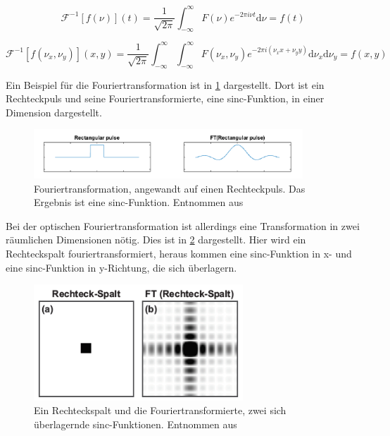 \begin{equation}
	\mathcal{F}^{-1}\left[ f\left( \nu\right) \right] \left( t\right) = \frac{1}{\sqrt{2\pi}} \int_{-\infty}^{\infty} F\left( \nu\right) e^{-2\pi i \nu t} \text{d}\nu = f\left( t\right) 
	\label{eq:trück}
\end{equation}

\begin{equation}
	\mathcal{F}^{-1}\left[ f\left( \nu_x,\nu_y\right) \right] \left( x, y\right) = \frac{1}{\sqrt{2\pi}} \int_{-\infty}^{\infty} \int_{-\infty}^{\infty} F\left( \nu_x,\nu_y\right) e^{-2\pi i (\nu_x x + \nu_y y)} \text{d}\nu_x \text{d}\nu_y = f\left( x, y\right) 
	\label{eq:xyrück}
\end{equation}

Ein Beispiel für die Fouriertransformation ist in \cref{rechteckpuls} dargestellt. Dort ist ein Rechteckpuls und seine Fouriertransformierte, eine sinc-Funktion, in einer Dimension dargestellt. 

\begin{figure}[h!]
	\centering
	\includegraphics[width=0.9\textwidth]{rechteckpuls.png}
	\caption{Fouriertransformation, angewandt auf einen Rechteckpuls. Das Ergebnis ist eine sinc-Funktion. Entnommen aus \cite[3]{anleitung-ws2014}}
	\label{rechteckpuls}
\end{figure}

Bei der optischen Fouriertransformation ist allerdings eine Transformation in zwei räumlichen Dimensionen nötig. Dies ist in \cref{rechteckspalt} dargestellt. Hier wird ein Rechteckspalt fouriertransformiert, heraus kommen eine sinc-Funktion in x- und eine sinc-Funktion in y-Richtung, die sich überlagern.

\begin{figure}[h!]
	\centering
	\includegraphics[width=0.7\textwidth]{rechteckspalt.png}
	\caption{Ein Rechteckspalt und die Fouriertransformierte, zwei sich überlagernde sinc-Funktionen. Entnommen aus \cite[4]{anleitung-ws2014}}
	\label{rechteckspalt}
\end{figure}


